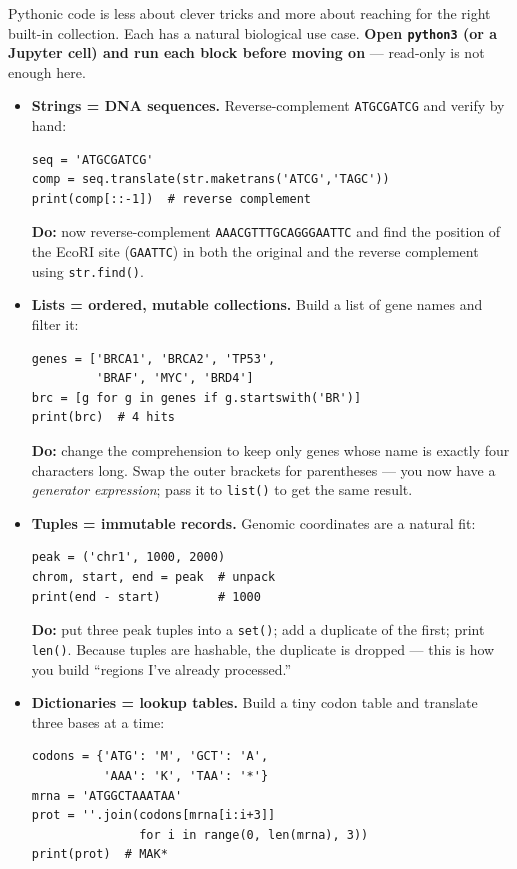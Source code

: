 Pythonic code is less about clever tricks and more about reaching for the right built-in collection. Each has a natural biological use case. \textbf{Open \texttt{python3} (or a Jupyter cell) and run each block before moving on} --- read-only is not enough here.
\begin{itemize}[nosep]
  \item \textbf{Strings = DNA sequences.} Reverse-complement \texttt{ATGCGATCG} and verify by hand:
    \begin{lstlisting}
seq = 'ATGCGATCG'
comp = seq.translate(str.maketrans('ATCG','TAGC'))
print(comp[::-1])  # reverse complement
    \end{lstlisting}
    \textbf{Do:} now reverse-complement \texttt{AAACGTTTGCAGGGAATTC} and find the position of the EcoRI site (\texttt{GAATTC}) in both the original and the reverse complement using \texttt{str.find()}.
  \item \textbf{Lists = ordered, mutable collections.} Build a list of gene names and filter it:
    \begin{lstlisting}
genes = ['BRCA1', 'BRCA2', 'TP53',
         'BRAF', 'MYC', 'BRD4']
brc = [g for g in genes if g.startswith('BR')]
print(brc)  # 4 hits
    \end{lstlisting}
    \textbf{Do:} change the comprehension to keep only genes whose name is exactly four characters long. Swap the outer brackets for parentheses --- you now have a \textit{generator expression}; pass it to \texttt{list()} to get the same result.
  \item \textbf{Tuples = immutable records.} Genomic coordinates are a natural fit:
    \begin{lstlisting}
peak = ('chr1', 1000, 2000)
chrom, start, end = peak  # unpack
print(end - start)        # 1000
    \end{lstlisting}
    \textbf{Do:} put three peak tuples into a \texttt{set()}; add a duplicate of the first; print \texttt{len()}. Because tuples are hashable, the duplicate is dropped --- this is how you build ``regions I've already processed.''
  \item \textbf{Dictionaries = lookup tables.} Build a tiny codon table and translate three bases at a time:
    \begin{lstlisting}
codons = {'ATG': 'M', 'GCT': 'A',
          'AAA': 'K', 'TAA': '*'}
mrna = 'ATGGCTAAATAA'
prot = ''.join(codons[mrna[i:i+3]]
               for i in range(0, len(mrna), 3))
print(prot)  # MAK*
    \end{lstlisting}

\end{itemize}
